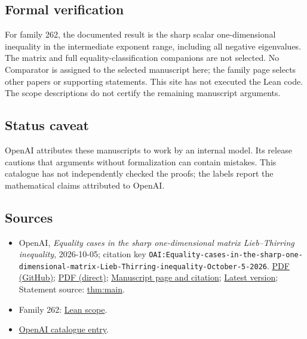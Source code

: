 \documentclass[11pt]{article}
\begin{document}
\subsection{Formal verification}
For family 262, the documented result is the sharp scalar one-dimensional inequality in the intermediate exponent range, including all negative eigenvalues. The matrix and full equality-classification companions are not selected. No Comparator is assigned to the selected manuscript here; the family page selects other papers or supporting statements. This site has not executed the Lean code. The scope descriptions do not certify the remaining manuscript arguments.

\subsection{Status caveat}
OpenAI attributes these manuscripts to work by an internal model. Its release cautions that arguments without formalization can contain mistakes. This catalogue has not independently checked the proofs; the labels report the mathematical claims attributed to OpenAI.

\subsection{Sources}
\begin{itemize}
\item OpenAI, \emph{Equality cases in the sharp one-dimensional matrix Lieb–Thirring inequality}, 2026-10-05; citation key \texttt{OAI:Equality-cases-in-the-sharp-one-dimensional-matrix-Lieb-Thirring-inequality-October-5-2026}. \href{https://github.com/openai/math/blob/adc7f1241b42e322a6451854ab7e4b4c146bf78a/preprints/Equality-cases-in-the-sharp-one-dimensional-matrix-Lieb-Thirring-inequality-October-5-2026/sharp-one-dimensional-lieb-thirring-inequalities-matrix-potentials.pdf}{PDF (GitHub)}; \href{https://github.com/openai/math/raw/adc7f1241b42e322a6451854ab7e4b4c146bf78a/preprints/Equality-cases-in-the-sharp-one-dimensional-matrix-Lieb-Thirring-inequality-October-5-2026/sharp-one-dimensional-lieb-thirring-inequalities-matrix-potentials.pdf}{PDF (direct)}; \href{https://github.com/openai/math/blob/adc7f1241b42e322a6451854ab7e4b4c146bf78a/preprints/Equality-cases-in-the-sharp-one-dimensional-matrix-Lieb-Thirring-inequality-October-5-2026/README.md}{Manuscript page and citation}; \href{https://github.com/openai/math/blob/main/preprints/Equality-cases-in-the-sharp-one-dimensional-matrix-Lieb-Thirring-inequality-October-5-2026/sharp-one-dimensional-lieb-thirring-inequalities-matrix-potentials.pdf}{Latest version}; Statement source: \href{https://github.com/openai/math/blob/adc7f1241b42e322a6451854ab7e4b4c146bf78a/preprints/Equality-cases-in-the-sharp-one-dimensional-matrix-Lieb-Thirring-inequality-October-5-2026/build/sections/introduction.tex\#L34}{thm:main}.
\item Family 262: \href{https://github.com/openai/math/blob/adc7f1241b42e322a6451854ab7e4b4c146bf78a/lean/docs/262.md}{Lean scope}.
\item \href{https://github.com/openai/math/blob/adc7f1241b42e322a6451854ab7e4b4c146bf78a/CONTENTS.md}{OpenAI catalogue entry}.
\end{itemize}
\end{document}

